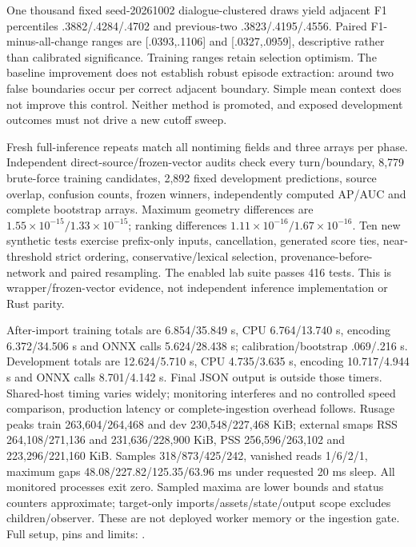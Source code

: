 \documentclass[11pt]{article}
\begin{document}
One thousand fixed seed-20261002 dialogue-clustered draws yield adjacent F1
percentiles .3882/.4284/.4702 and previous-two .3823/.4195/.4556. Paired
F1-minus-all-change ranges are [.0393,.1106] and [.0327,.0959], descriptive
rather than calibrated significance. Training ranges retain selection optimism.
The baseline improvement does not establish robust episode extraction: around
two false boundaries occur per correct adjacent boundary. Simple mean context
does not improve this control. Neither method is promoted, and exposed development
outcomes must not drive a new cutoff sweep.

Fresh full-inference repeats match all nontiming fields and three arrays per
phase. Independent direct-source/frozen-vector audits check every turn/boundary,
8,779 brute-force training candidates, 2,892 fixed development predictions,
source overlap, confusion counts, frozen winners, independently computed AP/AUC
and complete bootstrap arrays. Maximum geometry differences are
$1.55\times10^{-15}/1.33\times10^{-15}$; ranking differences
$1.11\times10^{-16}/1.67\times10^{-16}$. Ten new synthetic tests exercise
prefix-only inputs, cancellation, generated score ties, near-threshold strict
ordering, conservative/lexical selection, provenance-before-network and paired
resampling. The enabled lab suite passes 416 tests. This is wrapper/frozen-vector
evidence, not independent inference implementation or Rust parity.

After-import training totals are 6.854/35.849 s, CPU 6.764/13.740 s, encoding
6.372/34.506 s and ONNX calls 5.624/28.438 s; calibration/bootstrap .069/.216 s.
Development totals are 12.624/5.710 s, CPU 4.735/3.635 s, encoding 10.717/4.944 s
and ONNX calls 8.701/4.142 s. Final JSON output is outside those timers. Shared-host
timing varies widely; monitoring interferes and no controlled speed comparison,
production latency or complete-ingestion overhead follows.
Rusage peaks train 263,604/264,468 and dev 230,548/227,468 KiB; external smaps RSS
264,108/271,136 and 231,636/228,900 KiB, PSS 256,596/263,102 and
223,296/221,160 KiB. Samples 318/873/425/242, vanished reads 1/6/2/1,
maximum gaps 48.08/227.82/125.35/63.96 ms under requested 20 ms sleep.
All monitored processes exit zero. Sampled maxima are lower bounds and status
counters approximate; target-only imports/assets/state/output scope excludes
children/observer. These are not deployed worker memory or the ingestion gate.
Full setup, pins and limits: .
\end{document}
